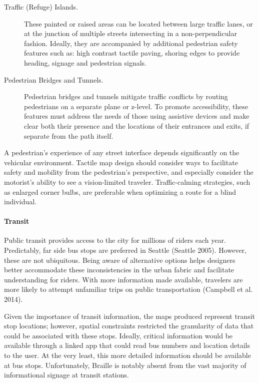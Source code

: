\begin{description}
\item[Traffic (Refuge) Islands.]
These painted or raised areas can be located between large traffic lanes, or at the junction of multiple streets intersecting in a non-perpendicular fashion.  Ideally, they  are accompanied by additional pedestrian safety features such as: high contrast tactile paving, shoring edges to provide heading, signage and pedestrian signals.

\item[Pedestrian Bridges and Tunnels.]
Pedestrian bridges and tunnels mitigate traffic conflicts by routing pedestrians on a separate plane or z-level.  To promote accessibility, these features must address the needs of those using assistive devices and make clear both their presence and the locations of their entrances and exits, if separate from the path itself.
\end{description}

A pedestrian’s experience of any street interface depends significantly on the vehicular environment.  Tactile map design should consider ways to facilitate safety and mobility from the pedestrian's perspective, and especially consider the motorist's ability to see a vision-limited traveler. Traffic-calming strategies, such as enlarged corner bulbs, are preferable when optimizing a route for a blind individual. 


\paragraph{Transit} 
Public transit provides access to the city for millions of riders each year.  Predictably, far side bus stops are preferred in Seattle (Seattle 2005). 
However, these are not ubiquitous. Being aware of alternative options helps designers better accommodate these inconsistencies in the urban fabric and facilitate understanding for riders. With more information made available, travelers are more likely to attempt unfamiliar trips on public transportation (Campbell et al. 2014).  

Given the importance of transit information, the maps produced 
represent transit stop locations; however, spatial constraints restricted the granularity of data that could be associated with these stops. Ideally, critical information would be available through a linked app that could read bus numbers and location details to the user.  At the very least, this more detailed information should be available at bus stops.  Unfortunately, Braille is notably absent from the vast majority of informational signage at transit stations. 


